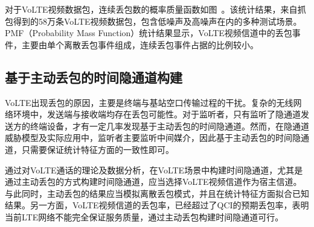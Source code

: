 
对于VoLTE视频数据包，连续丢包数的概率质量函数如图\ 。该统计结果，来自抓包得到的58万条VoLTE视频数据包，包含低噪声及高噪声在内的多种测试场景。PMF（Probability Mass Function）统计结果显示，VoLTE视频信道中的丢包事件，主要由单个离散丢包事件组成，连续丢包事件占据的比例较小。

\subsection{基于主动丢包的时间隐通道构建}
\label{chap:backinfo:volte:scheme}
VoLTE出现丢包的原因，主要是终端与基站空口传输过程的干扰。复杂的无线网络环境中，发送端与接收端均存在丢包可能性。对于监听者，只有监听了隐通道发送方的终端设备，才有一定几率发现基于主动丢包的时间隐通道。然而，在隐通道威胁模型及实际应用中，监听者主要监听中间媒介，因此基于主动丢包的时间隐通道，只需要保证统计特征方面的一致性即可。

通过对VoLTE通话的理论及数据分析，在VoLTE场景中构建时间隐通道，尤其是通过主动丢包的方式构建时间隐通道，应当选择VoLTE视频信道作为宿主信道。与此同时，主动丢包的结果应当模拟离散丢包模式，并且在统计特征方面拟合已知结果。另一方面，VoLTE视频信道的丢包率，已经超过了QCI的预期丢包率，表明当前LTE网络不能完全保证服务质量，通过主动丢包构建时间隐通道可行。